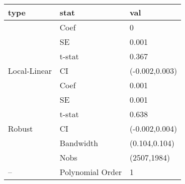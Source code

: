 
\begin{tabular}{lll}
\toprule
type & stat & val\\
\midrule
 & Coef & 0\\

 & SE & 0.001\\

 & t-stat & 0.367\\

\multirow{-4}{*}{\raggedright\arraybackslash Local-Linear} & CI & (-0.002,0.003)\\
\cmidrule{1-3}
 & Coef & 0.001\\

 & SE & 0.001\\

 & t-stat & 0.638\\

\multirow{-4}{*}{\raggedright\arraybackslash Robust} & CI & (-0.002,0.004)\\
\cmidrule{1-3}
 & Bandwidth & (0.104,0.104)\\

 & Nobs & (2507,1984)\\

\multirow{-3}{*}{\raggedright\arraybackslash --} & Polynomial Order & 1\\
\bottomrule
\end{tabular}